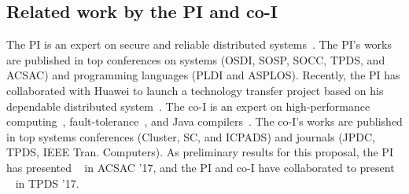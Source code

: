 

\vspace{-.15in}\subsection{Related work by the PI and co-I} 
\label{sec:my-work}\vspace{-.075in}
% 

The PI is an expert on secure and reliable distributed 
systems~\cite{smt:cacm, cui:tern:osdi10, peregrine:sosp11,
parrot:sosp13, crane:sosp15, tripod:apsys16, kakute:acsac17, apus:socc17,
confluence:tpds17}. The PI's works are published in top conferences on systems 
(OSDI, SOSP, SOCC, TPDS, and ACSAC) and programming languages (PLDI and ASPLOS). 
Recently, the PI has collaborated with Huawei to launch a technology transfer 
project based on his dependable distributed system~\cite{apus:socc17}.
The co-I is an expert on high-performance 
computing~\cite{powerrock,hwang,jessica,cheung,khokhar}, fault-tolerance~\cite{ 
sheng,shengdi1}, and Java compilers~\cite{rhymes,shengdi,jessica2}. The 
co-I's works are published in top systems conferences (Cluster, SC, 
and ICPADS) and journals (JPDC, TPDS, IEEE Tran. Computers). As 
preliminary results for this proposal, the PI has 
presented \kakute~\cite{kakute:acsac17} in ACSAC '17, and the PI and co-I have 
collaborated to present \confluence~\cite{confluence:tpds17} in TPDS '17.


